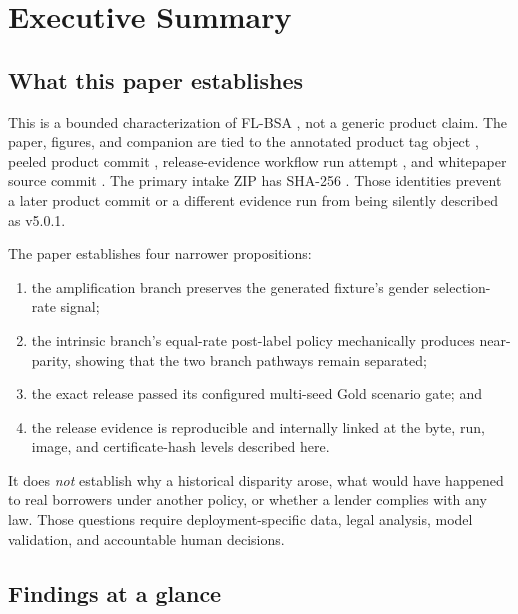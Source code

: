 \section{Executive Summary}

\subsection{What this paper establishes}

This is a bounded characterization of FL-BSA \ProductReleaseTag{}, not a generic product claim.
The paper, figures, and companion are tied to the annotated product tag object
\IdentityText{\ProductTagObjectRaw}, peeled product commit
\IdentityText{\ProductCommitRaw}, release-evidence workflow run \EvidenceRunRaw{} attempt
\EvidenceRunAttemptRaw{}, and whitepaper source commit \IdentityText{\WhitepaperCommitRaw}. The
primary intake ZIP has SHA-256 \IdentityText{\EvidenceBundleShaRaw}. Those identities prevent a
later product commit or a different evidence run from being silently described as v5.0.1.

The paper establishes four narrower propositions:

\begin{enumerate}
  \item the amplification branch preserves the generated fixture's gender selection-rate signal;
  \item the intrinsic branch's equal-rate post-label policy mechanically produces near-parity,
        showing that the two branch pathways remain separated;
  \item the exact release passed its configured multi-seed Gold scenario gate; and
  \item the release evidence is reproducible and internally linked at the byte, run, image, and
        certificate-hash levels described here.
\end{enumerate}

It does \emph{not} establish why a historical disparity arose, what would have happened to real
borrowers under another policy, or whether a lender complies with any law. Those questions require
deployment-specific data, legal analysis, model validation, and accountable human decisions.

\subsection{Findings at a glance}

